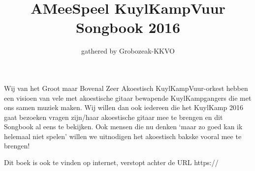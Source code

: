 \documentclass[a4,openany,landscape]{article}
\title{AMeeSpeel KuylKampVuur Songbook 2016}
\author{gathered by Grobozeak-KKVO}
\begin{document}

\maketitle
Wij van het Groot maar Bovenal Zeer Akoestisch KuylKampVuur-orkest hebben een visioen van vele met akoestische gitaar bewapende KuylKampgangers die met ons samen muziek maken. Wij willen dan ook iedereen die het KuylKamp 2016 gaat bezoeken vragen zijn/haar akoestische gitaar mee te brengen en dit Songbook al eens te bekijken. Ook mensen die nu denken `maar zo goed kan ik helemaal niet spelen' willen we uitnodigen het akoestisch bakske vooral mee te brengen! 


Dit boek is ook te vinden op internet, verstopt achter de URL https://






\begin{songs}{} %



						
						
	
	
	
	
	
	
	
	
	
	
	
	
	
	
	
	
	


%			
\end{songs}




\end{document}
